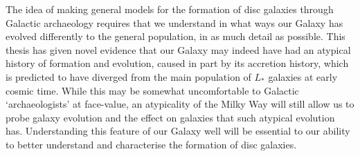 The idea of making general models for the formation of disc galaxies through Galactic archaeology requires that we understand in what ways our Galaxy has evolved differently to the general population, in as much detail as possible. This thesis has given novel evidence that our Galaxy may indeed have had an atypical history of formation and evolution, caused in part by its accretion history, which is predicted to have diverged from the main population of $L_*$ galaxies at early cosmic time. While this may be somewhat uncomfortable to Galactic `archaeologists' at face-value, an atypicality of the Milky Way will still allow us to probe galaxy evolution and the effect on galaxies that such atypical evolution has. Understanding this feature of our Galaxy well will be essential to our ability to better understand and characterise the formation of disc galaxies.